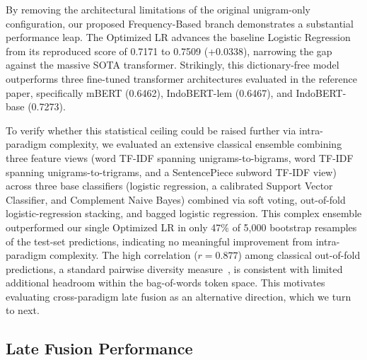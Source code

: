 \documentclass[conference]{IEEEtran}
\begin{document}
By removing the architectural limitations of the original unigram-only configuration, our proposed Frequency-Based branch demonstrates a substantial performance leap. The Optimized LR advances the baseline Logistic Regression from its reproduced score of 0.7171 to 0.7509 (+0.0338), narrowing the gap against the massive SOTA transformer. Strikingly, this dictionary-free model outperforms three fine-tuned transformer architectures evaluated in the reference paper, specifically mBERT (0.6462), IndoBERT-lem (0.6467), and IndoBERT-base (0.7273). 

To verify whether this statistical ceiling could be raised further via intra-paradigm complexity, we evaluated an extensive classical ensemble combining three feature views (word TF-IDF spanning unigrams-to-bigrams, word TF-IDF spanning unigrams-to-trigrams, and a SentencePiece subword TF-IDF view) across three base classifiers (logistic regression, a calibrated Support Vector Classifier, and Complement Naive Bayes) combined via soft voting, out-of-fold logistic-regression stacking, and bagged logistic regression. This complex ensemble outperformed our single Optimized LR in only 47\% of 5,000 bootstrap resamples of the test-set predictions, indicating no meaningful improvement from intra-paradigm complexity. The high correlation ($r = 0.877$) among classical out-of-fold predictions, a standard pairwise diversity measure~\cite{Kuncheva2003Measures}, is consistent with limited additional headroom within the bag-of-words token space. This motivates evaluating cross-paradigm late fusion as an alternative direction, which we turn to next.

\subsection{Late Fusion Performance}
\end{document}
